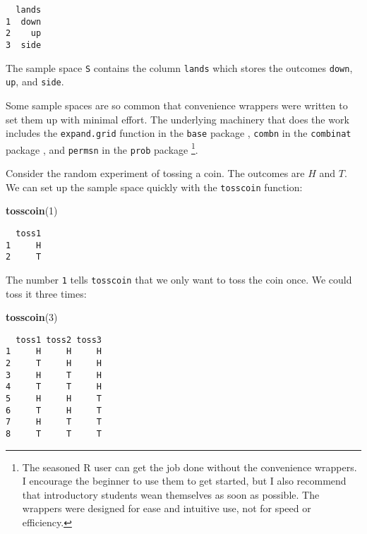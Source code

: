 \documentclass[]{book}
\newenvironment{Shaded}{\begin{snugshade}}{\end{snugshade}}
\newcommand{\KeywordTok}[1]{\textcolor[rgb]{0.13,0.29,0.53}{\textbf{{#1}}}}
\newcommand{\DecValTok}[1]{\textcolor[rgb]{0.00,0.00,0.81}{{#1}}}
\newcommand{\NormalTok}[1]{{#1}}
\let\rmarkdownfootnote\footnote%
\def\footnote{\protect\rmarkdownfootnote}
\numberwithin{equation}{chapter}
\numberwithin{figure}{chapter}
\theoremstyle{plain}
\theoremstyle{definition}
\theoremstyle{remark}
\theoremstyle{definition}
\theoremstyle{definition}
\theoremstyle{remark}
\begin{document}
\begin{verbatim}
  lands
1  down
2    up
3  side
\end{verbatim}

The sample space \texttt{S} contains the column \texttt{lands} which
stores the outcomes \texttt{down}, \texttt{up}, and \texttt{side}.

Some sample spaces are so common that convenience wrappers were written
to set them up with minimal effort. The underlying machinery that does
the work includes the \texttt{expand.grid} function in the \texttt{base}
package \autocite{base}, \texttt{combn} in the \texttt{combinat} package
\autocite{combinat}, and \texttt{permsn} in the \texttt{prob} package
\autocite{prob}\footnote{The seasoned R user can get the job done
  without the convenience wrappers. I encourage the beginner to use them
  to get started, but I also recommend that introductory students wean
  themselves as soon as possible. The wrappers were designed for ease
  and intuitive use, not for speed or efficiency.}.

Consider the random experiment of tossing a coin. The outcomes are \(H\)
and \(T\). We can set up the sample space quickly with the
\texttt{tosscoin} function:

\begin{Shaded}
\begin{Highlighting}[]
\KeywordTok{tosscoin}\NormalTok{(}\DecValTok{1}\NormalTok{)}
\end{Highlighting}
\end{Shaded}

\begin{verbatim}
  toss1
1     H
2     T
\end{verbatim}

The number \texttt{1} tells \texttt{tosscoin} that we only want to toss
the coin once. We could toss it three times:

\begin{Shaded}
\begin{Highlighting}[]
\KeywordTok{tosscoin}\NormalTok{(}\DecValTok{3}\NormalTok{)}
\end{Highlighting}
\end{Shaded}

\begin{verbatim}
  toss1 toss2 toss3
1     H     H     H
2     T     H     H
3     H     T     H
4     T     T     H
5     H     H     T
6     T     H     T
7     H     T     T
8     T     T     T
\end{verbatim}
\end{document}
